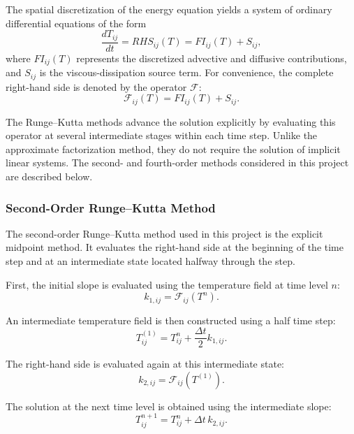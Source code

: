 The spatial discretization of the energy equation yields a system
of ordinary differential equations of the form
\begin{equation}
\frac{dT_{ij}}{dt}=RHS_{ij}(T)=FI_{ij}(T)+S_{ij},
\label{eq:rk_semidiscrete}
\end{equation}
where $FI_{ij}(T)$ represents the discretized advective and
diffusive contributions, and $S_{ij}$ is the viscous-dissipation
source term. For convenience, the complete right-hand side is
denoted by the operator $\mathcal{F}$:
\begin{equation}
\mathcal{F}_{ij}(T)=FI_{ij}(T)+S_{ij}.
\label{eq:rk_rhs_operator}
\end{equation}

The Runge--Kutta methods advance the solution explicitly by
evaluating this operator at several intermediate stages within
each time step. Unlike the approximate factorization method,
they do not require the solution of implicit linear systems.
The second- and fourth-order methods considered in this project
are described below.

\subsubsection{Second-Order Runge--Kutta Method}

The second-order Runge--Kutta method used in this project is
the explicit midpoint method. It evaluates the right-hand side
at the beginning of the time step and at an intermediate
state located halfway through the step.

First, the initial slope is evaluated using the temperature
field at time level $n$:
\begin{equation}
k_{1,ij}=\mathcal{F}_{ij}(T^n).
\label{eq:rk2_k1}
\end{equation}

An intermediate temperature field is then constructed using
a half time step:
\begin{equation}
T_{ij}^{(1)}
=
T_{ij}^{n}+\frac{\Delta t}{2}k_{1,ij}.
\label{eq:rk2_intermediate}
\end{equation}

The right-hand side is evaluated again at this intermediate
state:
\begin{equation}
k_{2,ij}=\mathcal{F}_{ij}\left(T^{(1)}\right).
\label{eq:rk2_k2}
\end{equation}

The solution at the next time level is obtained using the
intermediate slope:
\begin{equation}
\boxed{
T_{ij}^{n+1}
=
T_{ij}^{n}+\Delta t\,k_{2,ij}.
}
\label{eq:rk2_update}
\end{equation}

